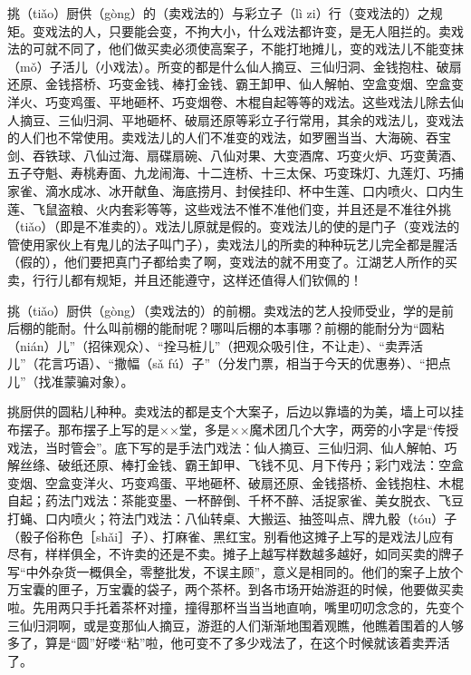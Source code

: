 \documentclass[12pt,UTF8]{ctexbook}
\begin{document}
挑（tiǎo）厨供（gòng）的（卖戏法的）与彩立子（lì zi）行（变戏法的）之规矩。变戏法的人，只要能会变，不拘大小，什么戏法都许变，是无人阻拦的。卖戏法的可就不同了，他们做买卖必须使高案子，不能打地摊儿，变的戏法儿不能变抹（mǒ）子活儿（小戏法）。所变的都是什么仙人摘豆、三仙归洞、金钱抱柱、破扇还原、金钱搭桥、巧变金钱、棒打金钱、霸王卸甲、仙人解帕、空盒变烟、空盒变洋火、巧变鸡蛋、平地砸杯、巧变烟卷、木棍自起等等的戏法。这些戏法儿除去仙人摘豆、三仙归洞、平地砸杯、破扇还原等彩立子行常用，其余的戏法儿，变戏法的人们也不常使用。卖戏法儿的人们不准变的戏法，如罗圈当当、大海碗、吞宝剑、吞铁球、八仙过海、扇碟扇碗、八仙对果、大变酒席、巧变火炉、巧变黄酒、五子夺魁、寿桃寿面、九龙闹海、十二连桥、十三太保、巧变珠灯、九莲灯、巧捕家雀、滴水成冰、冰开献鱼、海底捞月、封侯挂印、杯中生莲、口内喷火、口内生莲、飞鼠盗粮、火内套彩等等，这些戏法不惟不准他们变，并且还是不准往外挑（tiǎo）（即是不准卖的）。戏法儿原就是假的。变戏法儿的使的是门子（变戏法的管使用家伙上有鬼儿的法子叫门子），卖戏法儿的所卖的种种玩艺儿完全都是腥活（假的），他们要把真门子都给卖了啊，变戏法的就不用变了。江湖艺人所作的买卖，行行儿都有规矩，并且还能遵守，这样还值得人们钦佩的！

挑（tiǎo）厨供（gòng）（卖戏法的）的前棚。卖戏法的艺人投师受业，学的是前后棚的能耐。什么叫前棚的能耐呢？哪叫后棚的本事哪？前棚的能耐分为“圆粘（nián）儿”（招徕观众）、“拴马桩儿”（把观众吸引住，不让走）、“卖弄活儿”（花言巧语）、“撒幅（sǎ fú）子”（分发门票，相当于今天的优惠券）、“把点儿”（找准蒙骗对象）。

挑厨供的圆粘儿种种。卖戏法的都是支个大案子，后边以靠墙的为美，墙上可以挂布摆子。那布摆子上写的是××堂，多是××魔术团几个大字，两旁的小字是“传授戏法，当时管会”。底下写的是手法门戏法：仙人摘豆、三仙归洞、仙人解帕、巧解丝绦、破纸还原、棒打金钱、霸王卸甲、飞钱不见、月下传丹；彩门戏法：空盒变烟、空盒变洋火、巧变鸡蛋、平地砸杯、破扇还原、金钱搭桥、金钱抱柱、木棍自起；药法门戏法：茶能变墨、一杯醉倒、千杯不醉、活捉家雀、美女脱衣、飞豆打蝇、口内喷火；符法门戏法：八仙转桌、大搬运、抽签叫点、牌九骰（tóu）子（骰子俗称色［shǎi］子）、打麻雀、黑红宝。别看他这摊子上写的是戏法儿应有尽有，样样俱全，不许卖的还是不卖。摊子上越写样数越多越好，如同买卖的牌子写“中外杂货一概俱全，零整批发，不误主顾”，意义是相同的。他们的案子上放个万宝囊的匣子，万宝囊的袋子，两个茶杯。到各市场开始游逛的时候，他要做买卖啦。先用两只手托着茶杯对撞，撞得那杯当当当地直响，嘴里叨叨念念的，先变个三仙归洞啊，或是变那仙人摘豆，游逛的人们渐渐地围着观瞧，他瞧着围着的人够多了，算是“圆”好喽“粘”啦，他可变不了多少戏法了，在这个时候就该着卖弄活了。
\end{document}
